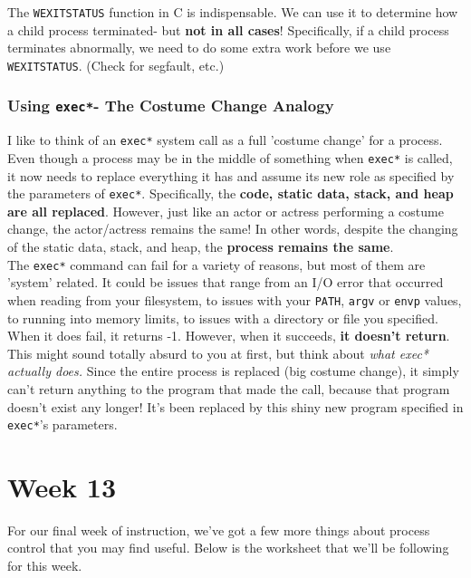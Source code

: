 \documentclass[english, 10pt]{article}
\begin{document}
The \texttt{WEXITSTATUS} function in C is indispensable. We can use it to determine how a child process terminated- but \textbf{not in all cases}! Specifically, if a child process terminates abnormally, we need to do some extra work before we use \texttt{WEXITSTATUS}. (Check for segfault, etc.)

\subsubsection{Using \texttt{exec*}- The Costume Change Analogy}

I like to think of an \texttt{exec*} system call as a full 'costume change' for a process. Even though a process may be in the middle of something when \texttt{exec*} is called, it now needs to replace everything it has and assume its new role as specified by the parameters of \texttt{exec*}. Specifically, the \textbf{code, static data, stack, and heap are all replaced}. However, just like an actor or actress performing a costume change, the actor/actress remains the same! In other words, despite the changing of the static data, stack, and heap, the \textbf{process remains the same}.\\

The \texttt{exec*} command can fail for a variety of reasons, but most of them are 'system' related. It could be issues that range from an I/O error that occurred when reading from your filesystem, to issues with your \texttt{PATH}, \texttt{argv} or \texttt{envp} values, to running into memory limits, to issues with a directory or file you specified.\\

When it does fail, it returns -1. However, when it succeeds, \textbf{it doesn't return}. This might sound totally absurd to you at first, but think about \textit{what exec* actually does.} Since the entire process is replaced (big costume change), it simply can't return anything to the program that made the call, because that program doesn't exist any longer! It's been replaced by this shiny new program specified in \texttt{exec*}'s parameters.

\section{Week 13}

For our final week of instruction, we've got a few more things about process control that you may find useful. Below is the worksheet that we'll be following for this week.
\end{document}
